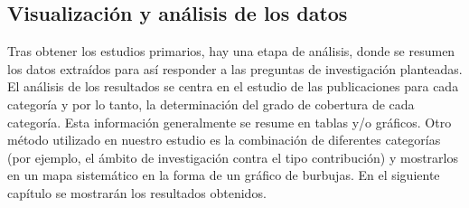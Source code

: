 \subsection{Visualización y análisis de los datos}
Tras obtener los estudios primarios, hay una etapa de análisis, donde se resumen los datos extraídos para así responder a las preguntas de investigación planteadas. El análisis de los resultados se centra en el estudio de las publicaciones para cada categoría y por lo tanto, la determinación del grado de cobertura de cada categoría. Esta información generalmente se resume en tablas y/o gráficos. Otro método utilizado en nuestro estudio es la combinación de diferentes categorías (por ejemplo, el ámbito de investigación contra el tipo contribución) y mostrarlos en un mapa sistemático en la forma de un gráfico de burbujas.
En el siguiente capítulo se mostrarán los resultados obtenidos.


